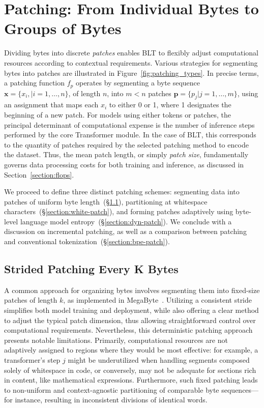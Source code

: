\section{Patching: From Individual Bytes to Groups of Bytes}
\label{section:patching}

Dividing bytes into discrete \textit{patches} enables {\textsc BLT} to flexibly adjust computational resources according to contextual requirements. Various strategies for segmenting bytes into patches are illustrated in Figure~\ref{fig:patching_types}. In precise terms, a patching function $f_p$ operates by segmenting a byte sequence $\pmb{x} = \{x_i, |i = 1, \ldots, n\}$, of length $n$, into $m < n$ patches $\pmb{p} = \{p_j | j = 1, \ldots, m\}$, using an assignment that maps each $x_i$ to either 0 or 1, where 1 designates the beginning of a new patch. For models using either tokens or patches, the principal determinant of computational expense is the number of inference steps performed by the core Transformer module. In the case of {\textsc BLT}, this corresponds to the quantity of patches required by the selected patching method to encode the dataset. Thus, the mean patch length, or simply \textit{patch size}, fundamentally governs data processing costs for both training and inference, as discussed in Section~\ref{section:flops}.

We proceed to define three distinct patching schemes: segmenting data into patches of uniform byte length~(\S\ref{section:static-patch}), partitioning at whitespace characters~(\S\ref{section:white-patch}), and forming patches adaptively using byte-level language model entropy~(\S\ref{section:dyn-patch}). We conclude with a discussion on incremental patching, as well as a comparison between patching and conventional tokenization~(\S\ref{section:bpe-patch}).

\subsection{Strided Patching Every K Bytes}
\label{section:static-patch}

A common approach for organizing bytes involves segmenting them into fixed-size patches of length $k$, as implemented in MegaByte~\citep{yu2023megabyte}. Utilizing a consistent stride simplifies both model training and deployment, while also offering a clear method to adjust the typical patch dimension, thus allowing straightforward control over computational requirements. Nevertheless, this deterministic patching approach presents notable limitations. Primarily, computational resources are not adaptively assigned to regions where they would be most effective: for example, a transformer's step $j$ might be underutilized when handling segments composed solely of whitespace in code, or conversely, may not be adequate for sections rich in content, like mathematical expressions. Furthermore, such fixed patching leads to non-uniform and context-agnostic partitioning of comparable byte sequences—for instance, resulting in inconsistent divisions of identical words.

